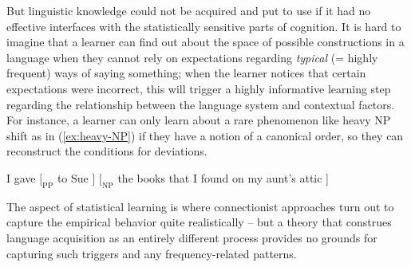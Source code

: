 \documentclass[output=paper,hidelinks]{langscibook}
\begin{document}
But linguistic knowledge could not be acquired and put to use if it had no effective interfaces with the statistically sensitive parts of cognition.
It is hard to imagine that a learner can find out about the space of possible constructions in a language when they cannot rely on expectations regarding \emph{typical} (= highly frequent) ways of saying something; when the learner notices that certain expectations were incorrect, this will trigger a highly informative learning step regarding the relationship between the language system and contextual factors.  For instance, a learner can only learn about  a rare phenomenon like heavy NP shift as in (\ref{ex:heavy-NP}) if they have a notion of a canonical order, so they can reconstruct the conditions for deviations.

\ea \label{ex:heavy-NP}
 I gave $[_\textrm{PP}$ to Sue ] $[_\textrm{NP}$ the books that I found on my aunt's attic ]
\z

\noindent
The aspect of statistical learning is where connectionist approaches turn out to capture the empirical behavior quite realistically -- but a theory that construes language acquisition as an entirely different process provides no grounds for capturing such triggers and any frequency-related patterns.
\end{document}
